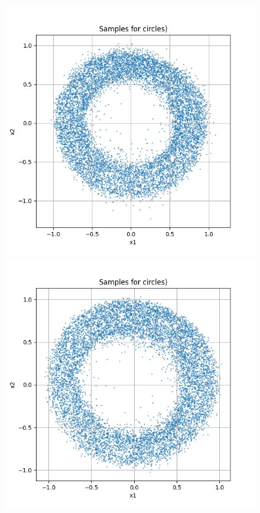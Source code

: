 \documentclass[a4paper,12pt]{article}
\begin{document}
\begin{figure}[H]
  \begin{minipage}{0.3\textwidth}
      \centering
      \includegraphics[width=\linewidth]{"images/Samples for ddpm_2_100_0.0001_0.02_circles.png"}
  \end{minipage}
  \begin{minipage}{0.3\textwidth}
      \centering
      \includegraphics[width=\linewidth]{"images/Samples for ddpm_2_150_0.0001_0.02_circles.png"}

\end{minipage}
\end{figure}
\end{document}
